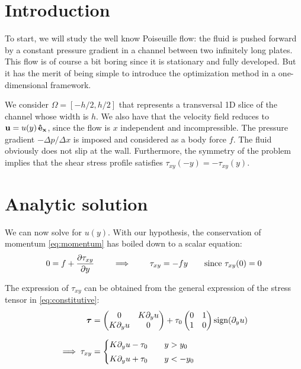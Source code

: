 \documentclass[11 pt]{report}
\begin{document}
\section{Introduction}
To start, we will study the well know Poiseuille flow: the fluid is pushed forward by a constant pressure gradient in a channel between two infinitely long plates. This flow is of course a bit boring since it is stationary and fully developed. But it has the merit of being simple to introduce the optimization method in a one-dimensional framework.

We consider $\Omega = [-h/2, h/2]$ that represents a transversal 1D slice of the channel whose width is $h$. We also have that the velocity field reduces to $\mathbf{u} = u(y)\,\mathbf{\hat{e}_x}$, since the flow is $x$ independent and incompressible. The pressure gradient $-\Delta p/\Delta x$ is imposed and considered as a body force $f$. The fluid obviously does not slip at the wall. Furthermore, the symmetry of the problem implies that the shear stress profile satisfies $\tau_{xy}(-y) = -\tau_{xy}(y)$.


\section{Analytic solution}
We can now solve for $u(y)$. With our hypothesis, the conservation of momentum \eqref{eq:momentum} has boiled down to a scalar equation:
\begin{align}
    0 = f + \pdv{\tau_{xy}}{y} \qquad \implies \qquad \tau_{xy} = -f y \qquad \text{since } \tau_{xy}(0)=0
    \label{eq:tau_xy}
\end{align}

The expression of $\tau_{xy}$ can be obtained from the general expression of the stress tensor in \eqref{eq:constitutive}:
\begin{align}
    \boldsymbol{\tau} &=
    \begin{pmatrix}
        0 & K \partial_y u\\
        K \partial_y u & 0\\
    \end{pmatrix} + \tau_0
    \begin{pmatrix}
        0 & 1\\
        1 & 0\\
    \end{pmatrix} \sign(\partial_y u) \\[6pt] %
    \implies \tau_{xy} &=
    \begin{cases}
        K \partial_y u - \tau_0  \qquad y > y_0\\[3pt]
        K \partial_y u + \tau_0  \qquad y < -y_0\\
    \end{cases} \label{eq:tau_xy_cases}
\end{align}
\end{document}
